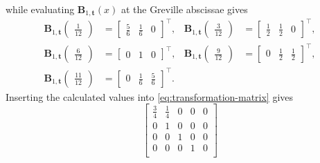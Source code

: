 \begin{indentedexample}
\begin{equation*}
\begin{aligned}
            \end{aligned}
        \end{equation*}
        while evaluating $\mathbf B_{1,\mathbf t}(x)$ at the Greville abscissae gives
        \begin{equation*}
            \begin{aligned}
                \mathbf B_{1, \mathbf t}\begin{pmatrix}\frac{1}{12}\end{pmatrix} &= \begin{bmatrix} \frac{5}{6} & \frac{1}{6} & 0 \end{bmatrix}^\top,
                &\mathbf B_{1, \mathbf t}\begin{pmatrix}\frac{3}{12}\end{pmatrix} &= \begin{bmatrix} \frac{1}{2} & \frac{1}{2} & 0 \end{bmatrix}^\top, \\
                \mathbf B_{1, \mathbf t}\begin{pmatrix}\frac{6}{12}\end{pmatrix} &= \begin{bmatrix} 0 & 1 & 0 \end{bmatrix}^\top,
                &\mathbf B_{1, \mathbf t}\begin{pmatrix}\frac{9}{12}\end{pmatrix} &= \begin{bmatrix} 0 & \frac{1}{2} & \frac{1}{2} \end{bmatrix}^\top, \\
                \mathbf B_{1, \mathbf t}\begin{pmatrix}\frac{11}{12}\end{pmatrix} &= \begin{bmatrix} 0 & \frac{1}{6} & \frac{5}{6} \end{bmatrix}^\top.
            \end{aligned}
        \end{equation*}
        Inserting the calculated values into \cref{eq:transformation-matrix} gives
        \begin{equation*}
            \begin{bmatrix}
                \frac{3}{4} & \frac{1}{4} & 0 & 0 & 0 \\
                0 & 1 & 0 & 0 & 0 \\
                0 & 0 & 1 & 0 & 0 \\
                0 & 0 & 0 & 1 & 0 \\

\end{bmatrix}
\end{equation*}
\end{indentedexample}
